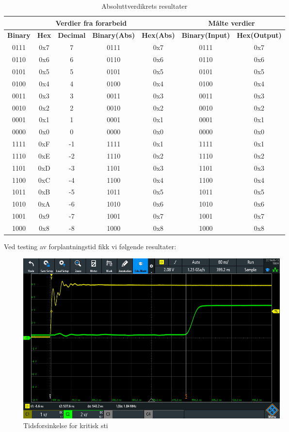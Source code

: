 \begin{table}[!htb]
  \caption{Absoluttverdikrets resultater}
  \begin{tabular}{c c c c c|c c}
    \multicolumn{5}{c|}{\textbf{Verdier fra forarbeid}} & \multicolumn{2}{c}{\textbf{Målte verdier}} \\ \hline
    \textbf{Binary} & \textbf{Hex} & \textbf{Decimal}  & \textbf{Binary(Abs)}  & \textbf{Hex(Abs)}  & \textbf{Binary(Input)} &  \textbf{Hex(Output)}\\ \hline
    0111  & 0x7 & 7 & 0111  & 0x7 & 0111  & 0x7 \\
    0110  & 0x6 & 6 & 0110  & 0x6 & 0110  & 0x6 \\
    0101  & 0x5 & 5 & 0101  & 0x5 & 0101  & 0x5 \\
    0100  & 0x4 & 4 & 0100  & 0x4 & 0100  & 0x4 \\
    0011  & 0x3 & 3 & 0011  & 0x3 & 0011  & 0x3 \\
    0010  & 0x2 & 2 & 0010  & 0x2 & 0010  & 0x2 \\
    0001  & 0x1 & 1 & 0001  & 0x1 & 0001  & 0x1 \\
    0000  & 0x0 & 0 & 0000  & 0x0 & 0000  & 0x0 \\ \hline
    1111  & 0xF & -1 & 1111  & 0x1 & 1111  & 0x1 \\
    1110  & 0xE & -2 & 1110  & 0x2 & 1110  & 0x2 \\
    1101  & 0xD & -3 & 1101  & 0x3 & 1101  & 0x3 \\
    1100  & 0xC & -4 & 1100  & 0x4 & 1100  & 0x4 \\
    1011  & 0xB & -5 & 1011  & 0x5 & 1011  & 0x5 \\
    1010  & 0xA & -6 & 1010  & 0x6 & 1010  & 0x6 \\
    1001  & 0x9 & -7 & 1001  & 0x7 & 1001  & 0x7 \\
    1000  & 0x8 & -8 & 1000  & 0x8 & 1000  & 0x8 \\

  \end{tabular}
\end{table}

\clearpage

Ved testing av forplantningstid fikk vi følgende resultater:

\begin{figure}
  \centering
  \caption{Tidsforsinkelse for kritisk sti}
  \includegraphics[width=14cm]{Bilder/fosinkelse.png}
\end{figure}

